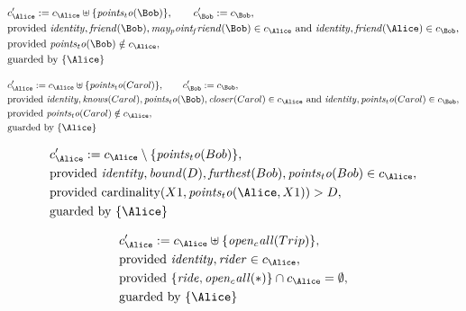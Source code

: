 \begin{align*}
&
c'_
{
\Alice
}
 := 
c_
{
\Alice
}
 \uplus 
\{
\mathit{
points_to
}
(
\Bob
)
\}
, \qquad 
c'_
{
\Bob
}
 := 
c_
{
\Bob
}
,\\
&
\text{provided } 
\mathit{
identity
}
,
\mathit{
friend
}
(
\Bob
)
,
\mathit{
may_point_friend
}
(
\Bob
)
 \in c_
{
\Alice
}
 \text{ and } 
\mathit{
identity
}
,
\mathit{
friend
}
(
\Alice
)
 \in c_
{
\Bob
}
,\\
&
\text{provided } 
\mathit{
points_to
}
(
\Bob
)
 \notin c_
{
\Alice
}
,\\
&
\text{guarded by } \{
\Alice
\}
\end{align*}

\begin{align*}
&
c'_
{
\Alice
}
 := 
c_
{
\Alice
}
 \uplus 
\{
\mathit{
points_to
}
(
Carol
)
\}
, \qquad 
c'_
{
\Bob
}
 := 
c_
{
\Bob
}
,\\
&
\text{provided } 
\mathit{
identity
}
,
\mathit{
knows
}
(
Carol
)
,
\mathit{
points_to
}
(
\Bob
)
,
\mathit{
closer
}
(
Carol
)
 \in c_
{
\Alice
}
 \text{ and } 
\mathit{
identity
}
,
\mathit{
points_to
}
(
Carol
)
 \in c_
{
\Bob
}
,\\
&
\text{provided } 
\mathit{
points_to
}
(
Carol
)
 \notin c_
{
\Alice
}
,\\
&
\text{guarded by } \{
\Alice
\}
\end{align*}

\begin{align*}
&
c'_
{
\Alice
}
 := 
c_
{
\Alice
}
 \setminus 
\{
\mathit{
points_to
}
(
Bob
)
\}
,\\
&
\text{provided } 
\mathit{
identity
}
,
\mathit{
bound
}
(
D
)
,
\mathit{
furthest
}
(
Bob
)
,
\mathit{
points_to
}
(
Bob
)
 \in c_
{
\Alice
}
,\\
&
\text{provided } 
\mathrm{cardinality}(
X1
,
\mathit{
points_to
}
(
\Alice
,
X1
)
)
>
D
,\\
&
\text{guarded by } \{
\Alice
\}
\end{align*}

\begin{align*}
&
c'_
{
\Alice
}
 := 
c_
{
\Alice
}
 \uplus 
\{
\mathit{
open_call
}
(
Trip
)
\}
,\\
&
\text{provided } 
\mathit{
identity
}
,
\mathit{
rider
}
 \in c_
{
\Alice
}
,\\
&
\text{provided } 
\{
\mathit{
ride
}
,
\mathit{
open_call
}
(
\ast
)
\}
 \cap c_
{
\Alice
}
 = \emptyset
,\\
&
\text{guarded by } \{
\Alice
\}
\end{align*}
